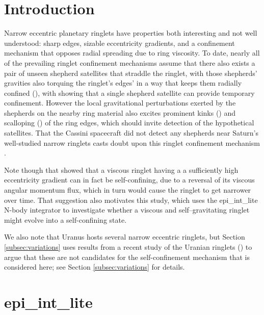 \documentclass[preprint]{aastex62}
\begin{document}


\section{Introduction}
\label{sec:intro}

Narrow eccentric planetary ringlets have properties both interesting and
not well understood: sharp edges,
sizable eccentricity gradients, and a confinement mechanism that
opposes radial spreading due to ring viscosity. To date, nearly all of the
prevailing ringlet confinement mechanisms assume that there also exists a pair of 
unseen shepherd satellites that straddle the ringlet, with those shepherds' gravities
also torquing the ringlet's edges' in a way that keeps them radially confined 
(\citealt{GT79, GT79c, GT81, CG00, ME02}), with \cite{Getal95} showing
that a single shepherd satellite can provide temporary confinement.
However the local gravitational perturbations exerted by 
the shepherds on the nearby ring material also excites prominent kinks (\citealt{Metal05}) and 
scalloping (\citealt{Wetal09}) of the ring edges,
which should invite detection of the hypothetical satellites.
That the Cassini spacecraft did not detect any shepherds near Saturn's
well-studied narrow ringlets casts doubt upon this ringlet confinement 
mechanism \citep{L18}. 

Note though that \cite{BGT82} showed that a viscous ringlet having a
a sufficiently high eccentricity gradient can in fact be self-confining,
due to a reversal of its viscous angular momentum flux, which in turn would
cause the ringlet to get narrower over time. 
That suggestion also motivates this study,
which uses the epi\_int\_lite N-body integrator to investigate whether a 
viscous and self--gravitating ringlet might evolve into a self-confining state.

We also note that Uranus hosts several narrow eccentric ringlets, but Section \ref{subsec:variations}
uses results from a recent study of the Uranian ringlets (\citealt{Fetal24})
to argue that these are not candidates for the self-confinement
mechanism that is considered here; see Section \ref{subsec:variations} for details.


\section{epi\_int\_lite}
\label{sec:epi_int_lite}
\end{document}
